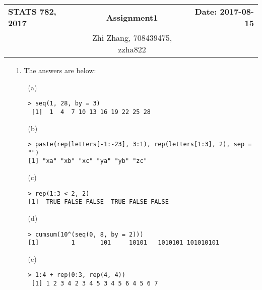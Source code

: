 \documentclass[11pt]{report}
\theoremstyle{definition}
\theoremstyle{remark}
\begin{document}
\begin{tabularx}{\textwidth}{l@{\extracolsep\fill} c r}
  \hline
  \textbf{STATS 782, 2017} & \textbf{Assignment1} & \textbf{Date: 2017-08-15} \\
   & Zhi Zhang, 708439475, zzha822 & \\
  \hline
\end{tabularx}

\begin{enumerate}
    \item[1.] The answers are below:
    \begin{enumerate}
    	\item[(a)] \begin{verbatim}> seq(1, 28, by = 3)
 [1]  1  4  7 10 13 16 19 22 25 28\end{verbatim}
 	\item[(b)] \begin{verbatim}> paste(rep(letters[-1:-23], 3:1), rep(letters[1:3], 2), sep = "")
[1] "xa" "xb" "xc" "ya" "yb" "zc"\end{verbatim}
 	\item[(c)] \begin{verbatim}> rep(1:3 < 2, 2)
[1]  TRUE FALSE FALSE  TRUE FALSE FALSE\end{verbatim}
 	\item[(d)] \begin{verbatim}> cumsum(10^(seq(0, 8, by = 2)))
[1]         1       101     10101   1010101 101010101\end{verbatim}
 	\item[(e)] \begin{verbatim}> 1:4 + rep(0:3, rep(4, 4))
 [1] 1 2 3 4 2 3 4 5 3 4 5 6 4 5 6 7\end{verbatim}
    \end{enumerate}


\end{enumerate}
\end{document}
